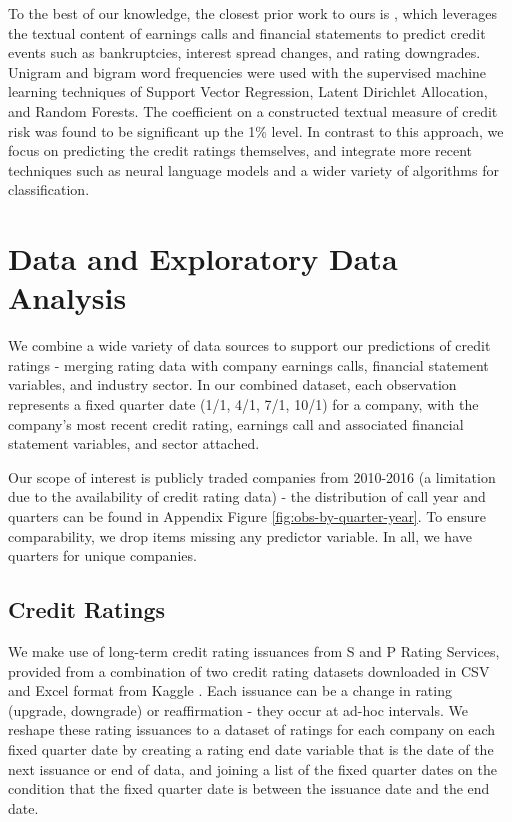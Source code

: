 \documentclass{article}[11pt]
\begin{document}
    To the best of our knowledge, the closest prior work to ours is \cite{donovan_measuring_2021}, which leverages the textual content of earnings calls and financial statements to predict credit events such as bankruptcies, interest spread changes, and rating downgrades. Unigram and bigram word frequencies were used with the supervised machine learning techniques of Support Vector Regression, Latent Dirichlet Allocation, and Random Forests. The coefficient on a constructed textual measure of credit risk was found to be significant up the 1\% level. In contrast to this approach, we focus on predicting the credit ratings themselves, and integrate more recent techniques such as neural language models and a wider variety of algorithms for classification.

    \section*{Data and Exploratory Data Analysis}

    We combine a wide variety of data sources to support our predictions of credit ratings - merging rating data with company earnings calls, financial statement variables, and industry sector. In our combined dataset, each observation represents a fixed quarter date (1/1, 4/1, 7/1, 10/1) for a company, with the company's most recent credit rating, earnings call and associated financial statement variables, and sector attached.

    Our scope of interest is publicly traded companies from 2010-2016 (a limitation due to the availability of credit rating data) - the distribution of call year and quarters can be found in Appendix Figure \ref{fig:obs-by-quarter-year}. To ensure comparability, we drop items missing any predictor variable. In all, we have \numQuarters \space quarters for \numCompanies \space unique companies.

    \subsection*{Credit Ratings}

    We make use of long-term credit rating issuances from S and P Rating Services, provided from a combination of two credit rating datasets downloaded in CSV and Excel format from Kaggle \citep{gewerc_corporate_2020,makwana_corporate_2022}. Each issuance can be a change in rating (upgrade, downgrade) or reaffirmation - they occur at ad-hoc intervals. We reshape these rating issuances to a dataset of ratings for each company on each fixed quarter date by creating a rating end date variable that is the date of the next issuance or end of data, and joining a list of the fixed quarter dates on the condition that the fixed quarter date is between the issuance date and the end date.
\end{document}
